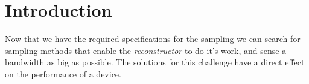 \documentclass[a4paper, openany, oneside]{memoir}
\begin{document}
\section{Introduction}
Now that we have the required specifications for the sampling we can search for sampling methods that enable the \textit{reconstructor} to do it's work, and sense a bandwidth as big as possible. The solutions for this challenge have a direct effect on the performance of a device.    
\end{document}
